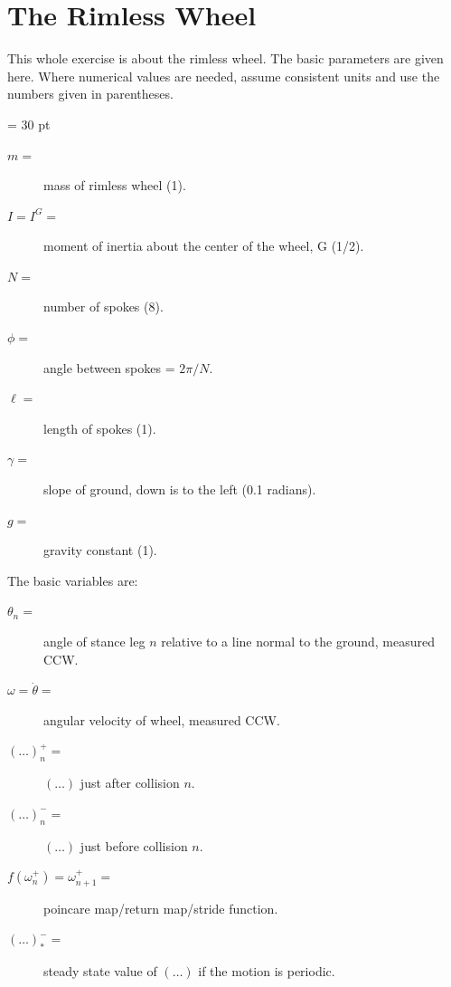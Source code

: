 \newpage
\section{The Rimless Wheel}

This whole exercise is about the rimless wheel. The basic parameters are given here.
Where numerical values are needed, assume consistent units and use the numbers given in parentheses.

\parindent = 30 pt
\begin{description}
\item[$ m=$] mass of rimless wheel (1).
\item[$ I=I^{G}=$] moment of inertia about the center of the wheel, G (1/2).
\item[$ N=$] number of spokes (8).
\item[$ \phi=$] angle between spokes = $2\pi/N$.
\item[$ \ell =$] length of spokes (1).
\item[$ \gamma =$] slope of ground, down is to the left (0.1 radians).
\item[$ g=$]  gravity constant (1).
\end{description}

The basic variables are:
\begin{description}
\item[$  \theta_n=$] angle of stance leg $n$ relative to a line normal to the ground, measured CCW.
\item[$  \omega=\dot\theta=$] angular velocity of wheel, measured CCW.
\item[$ (\dots)_{n}^{+}=$] $(\dots)$ just after collision $n$.
\item[$ (\dots)_{n}^{-}=$] $(\dots)$ just before collision $n$.
\item[$f(\omega_{n}^{+})  = \omega_{n+1}^{+} = $] poincare map/return map/stride function.
\item[$ (\dots)_{*}^{-} =$] steady state value of $(\dots)$ if the motion is periodic.
\end{description}

